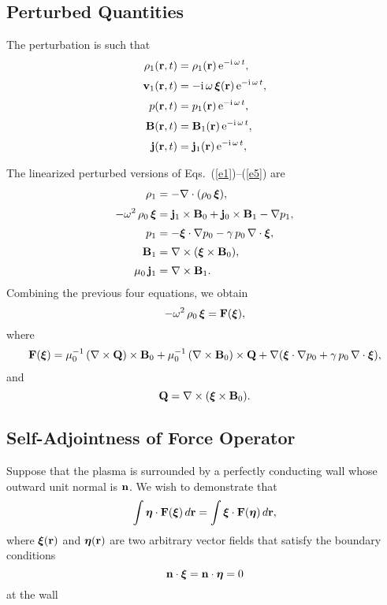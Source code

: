 \documentclass[12pt,prb,aps,notitlepage]{revtex4-1}
\newcommand{\bxi}{\mbox{\boldmath$\xi$}}
\newcommand{\bta}{\mbox{\boldmath$\eta$}}
\begin{document}
\subsection{Perturbed Quantities}
The perturbation is such that
\begin{align}
\rho_1({\bf r},t) &= \rho_1({\bf r})\,{\rm e}^{-{\rm i}\,\omega\,t},\\[0.5ex]
{\bf v}_1({\bf r},t) &= {-{\rm i}\,\omega}\,\bxi({\bf r})\,{\rm e}^{-{\rm i}\,\omega\,t},\\[0.5ex]
p({\bf r},t) &= p_1({\bf r})\,{\rm e}^{-{\rm i}\,\omega\,t},\\[0.5ex]
{\bf B}({\bf r},t) &= {\bf B}_1({\bf r})\,{\rm e}^{-{\rm i}\,\omega\,t},\\[0.5ex]
{\bf j}({\bf r},t) &= {\bf j}_1({\bf r})\,{\rm e}^{-{\rm i}\,\omega\,t},
\end{align}

The linearized perturbed versions of  Eqs.~(\ref{e1})--(\ref{e5}) are
\begin{align}
\rho_1 &=-\nabla\cdot(\rho_0\,\bxi),\\[0.5ex]
-\omega^2\,\rho_0\,\bxi &=  {\bf j}_1\times {\bf B}_0 + {\bf j}_0\times {\bf B}_1-\nabla p_1,\\[0.5ex]
p_1&= - \bxi\cdot\nabla p_0-\gamma\,p_0\,\nabla\cdot\bxi,\\[0.5ex]
{\bf B}_1 &=\nabla\times (\bxi\times {\bf B}_0),\\[0.5ex]
\mu_0\,{\bf j}_1&= \nabla\times {\bf B}_1.
\end{align}
Combining the previous four equations, we obtain
\begin{equation}
-\omega^2\,\rho_0\,\bxi= {\bf F}(\bxi),
\end{equation}
where
\begin{align}\label{e24}
{\bf F}(\bxi) = \mu_0^{-1}\,(\nabla\times {\bf Q})\times{\bf B}_0+ \mu_0^{-1}\, (\nabla\times {\bf B}_0)\times {\bf Q} + 
\nabla(\bxi\cdot \nabla p_0 + \gamma\,p_0\,\nabla\cdot\bxi),
\end{align}
and
\begin{equation}\label{e25}
{\bf Q} = \nabla\times (\bxi\times {\bf B}_0).
\end{equation}

\subsection{Self-Adjointness of Force Operator}
Suppose that the plasma is surrounded by a perfectly conducting wall whose outward unit normal is ${\bf n}$.
We wish to demonstrate that
\begin{equation}\label{e26}
\int \bta\cdot{\bf F}(\bxi)\,d{\bf r} = \int \bxi\cdot {\bf F}(\bta)\,d{\bf r},
\end{equation}
where $\bxi({\bf r})$ and $\bta({\bf r})$ are two arbitrary vector fields that satisfy the boundary conditions
\begin{equation}\label{e27}
{\bf n}\cdot\bxi={\bf n}\cdot\bta=0
\end{equation}
at the wall  
\end{document}
